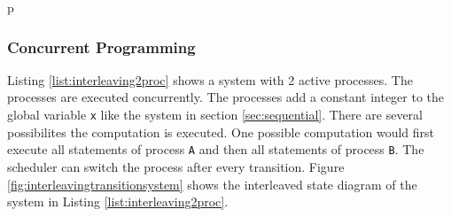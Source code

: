 p\documentclass[a4paper, twoside]{article}
\begin{document}
\subsubsection{Concurrent Programming}
\label{sec:concurrent}

Listing \ref{list:interleaving2proc} shows a system with 2 active processes. The processes are executed concurrently. The processes add a constant integer to the global variable \verb|x| like the system in section \ref{sec:sequential}. There are several possibilites the computation is executed. One possible computation would first execute all statements of process \verb|A| and then all statements of process \verb|B|. The scheduler can switch the process after every transition. Figure \ref{fig:interleavingtransitionsystem} shows the interleaved state diagram of the system in Listing \ref{list:interleaving2proc}.

  
\end{document}
